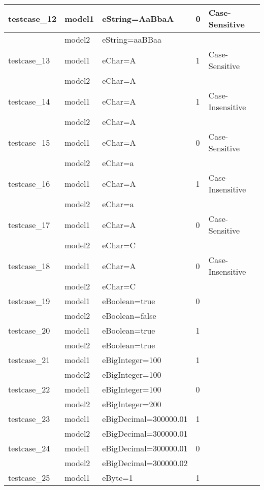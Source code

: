 \documentclass[a4paper]{article}
\begin{document}
\begin{longtable}{|l|l|l|l|l|}
\hline
\hline
testcase\_12 & model1 & eString=AaBbaA & 0 & Case-Sensitive\\
\hline
             & model2 & eString=aaBBaa & &\\
\hline
\hline
testcase\_13 & model1 & eChar=A & 1 & Case-Sensitive\\
\hline
             & model2 & eChar=A & &\\
\hline
\hline
testcase\_14 & model1 & eChar=A & 1 & Case-Insensitive\\
\hline
             & model2 & eChar=A & &\\
\hline
\hline
testcase\_15 & model1 & eChar=A & 0 & Case-Sensitive\\
\hline
             & model2 & eChar=a & &\\
\hline
\hline
testcase\_16 & model1 & eChar=A & 1 & Case-Insensitive\\
\hline
             & model2 & eChar=a & &\\
\hline
\hline
testcase\_17 & model1 & eChar=A & 0 & Case-Sensitive\\
\hline
             & model2 & eChar=C & &\\
\hline
\hline
testcase\_18 & model1 & eChar=A & 0 & Case-Insensitive\\
\hline
             & model2 & eChar=C & &\\
\hline
\hline
testcase\_19 & model1 & eBoolean=true & 0 &\\
\hline
             & model2 & eBoolean=false & &\\
\hline
\hline
testcase\_20 & model1 & eBoolean=true & 1 &\\
\hline
             & model2 & eBoolean=true & &\\
\hline
\hline
testcase\_21 & model1 & eBigInteger=100 & 1 &\\
\hline
             & model2 & eBigInteger=100 & &\\
\hline
\hline
testcase\_22 & model1 & eBigInteger=100 & 0 &\\
\hline
             & model2 & eBigInteger=200 & &\\
\hline
\hline
testcase\_23 & model1 & eBigDecimal=300000.01 & 1 &\\
\hline
             & model2 & eBigDecimal=300000.01 & &\\
\hline
\hline
testcase\_24 & model1 & eBigDecimal=300000.01 & 0 &\\
\hline
             & model2 & eBigDecimal=300000.02 & &\\
\hline
\hline
testcase\_25 & model1 & eByte=1 & 1 &\\

\end{longtable}
\end{document}
